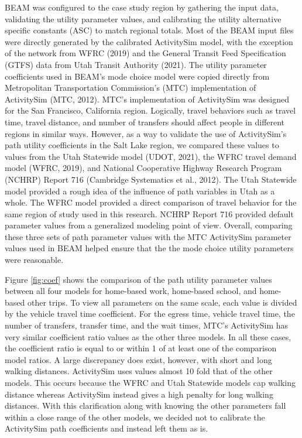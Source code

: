 \documentclass[simple, masters, twoside]{byuthesis}
\begin{document}
BEAM was configured to the case study region by gathering the input data, validating the utility parameter values, and calibrating the utility alternative specific constants (ASC) to match regional totals. Most of the BEAM input files were directly generated by the calibrated ActivitySim model, with the exception of the network from WFRC (2019) and the General Transit Feed Specification (GTFS) data from Utah Transit Authority (2021). The utility parameter coefficients used in BEAM's mode choice model were copied directly from Metropolitan Transportation Commission's (MTC) implementation of ActivitySim (MTC, 2012). MTC's implementation of ActivitySim was designed for the San Francisco, California region. Logically, travel behaviors such as travel time, travel distance, and number of transfers should affect people in different regions in similar ways. However, as a way to validate the use of ActivitySim's path utility coefficients in the Salt Lake region, we compared these values to values from the Utah Statewide model (UDOT, 2021), the WFRC travel demand model (WFRC, 2019), and National Cooperative Highway Research Program (NCHRP) Report 716 (Cambridge Systematics et al., 2012). The Utah Statewide model provided a rough idea of the influence of path variables in Utah as a whole. The WFRC model provided a direct comparison of travel behavior for the same region of study used in this research. NCHRP Report 716 provided default parameter values from a generalized modeling point of view. Overall, comparing these three sets of path parameter values with the MTC ActivitySim parameter values used in BEAM helped ensure that the the mode choice utility parameters were reasonable.

Figure \ref{fig:coef} shows the comparison of the path utility parameter values between all four models for home-based work, home-based school, and home-based other trips. To view all parameters on the same scale, each value is divided by the vehicle travel time coefficient. For the egress time, vehicle travel time, the number of transfers, transfer time, and the wait times, MTC's ActivitySim has very similar coefficient ratio values as the other three models. In all these cases, the coefficient ratio is equal to or within 1 of at least one of the comparison model ratios. A large discrepancy does exist, however, with short and long walking distances. ActivitySim uses values almost 10 fold that of the other models. This occurs because the WFRC and Utah Statewide models cap walking distance whereas ActivitySim instead gives a high penalty for long walking distances. With this clarification along with knowing the other parameters fall within a close range of the other models, we decided not to calibrate the ActivitySim path coefficients and instead left them as is.
\end{document}
